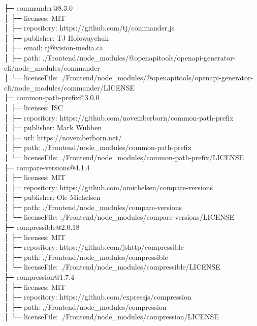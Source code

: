 ├─ commander@8.3.0\\
│  ├─ licenses: MIT\\
│  ├─ repository: https://github.com/tj/commander.js\\
│  ├─ publisher: TJ Holowaychuk\\
│  ├─ email: tj@vision-media.ca\\
│  ├─ path: ./Frontend/node\_modules/@openapitools/openapi-generator-cli/node\_modules/commander\\
│  └─ licenseFile: ./Frontend/node\_modules/@openapitools/openapi-generator-cli/node\_modules/commander/LICENSE\\
├─ common-path-prefix@3.0.0\\
│  ├─ licenses: ISC\\
│  ├─ repository: https://github.com/novemberborn/common-path-prefix\\
│  ├─ publisher: Mark Wubben\\
│  ├─ url: https://novemberborn.net/\\
│  ├─ path: ./Frontend/node\_modules/common-path-prefix\\
│  └─ licenseFile: ./Frontend/node\_modules/common-path-prefix/LICENSE\\
├─ compare-versions@4.1.4\\
│  ├─ licenses: MIT\\
│  ├─ repository: https://github.com/omichelsen/compare-versions\\
│  ├─ publisher: Ole Michelsen\\
│  ├─ path: ./Frontend/node\_modules/compare-versions\\
│  └─ licenseFile: ./Frontend/node\_modules/compare-versions/LICENSE\\
├─ compressible@2.0.18\\
│  ├─ licenses: MIT\\
│  ├─ repository: https://github.com/jshttp/compressible\\
│  ├─ path: ./Frontend/node\_modules/compressible\\
│  └─ licenseFile: ./Frontend/node\_modules/compressible/LICENSE\\
├─ compression@1.7.4\\
│  ├─ licenses: MIT\\
│  ├─ repository: https://github.com/expressjs/compression\\
│  ├─ path: ./Frontend/node\_modules/compression\\
│  └─ licenseFile: ./Frontend/node\_modules/compression/LICENSE\\
